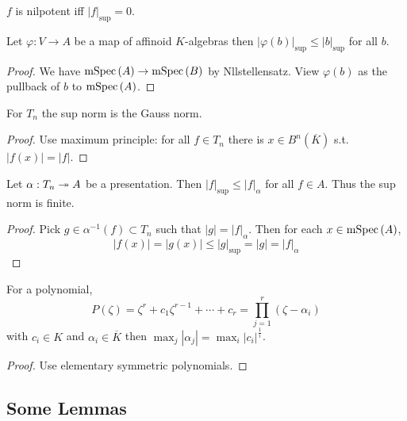 \documentclass[12pt]{article}
\begin{document}
\begin{rmk}
$f$ is nilpotent iff $|f|_{\sup} = 0$.
\end{rmk}

\begin{prop}
Let $\varphi : V \to A$ be a map of affinoid $K$-algebras then $|\varphi(b)|_{\sup} \le |b|_{\sup}$ for all $b$.
\end{prop}

\begin{proof}
We have $\mathrm{mSpec}\left( A \right) \to \mathrm{mSpec}\left( B \right)$ by Nllstellensatz. View $\varphi(b)$ as the pullback of $b$ to $\mathrm{mSpec}\left( A \right)$. 
\end{proof}

\begin{prop}
For $T_n$ the sup norm is the Gauss norm.
\end{prop}

\begin{proof}
Use maximum principle: for all $f \in T_n$ there is $x \in B^n(\overline{K})$ s.t. $|f(x)| = |f|$.
\end{proof}

\begin{prop}
Let $\alpha : T_n \twoheadrightarrow A$ be a presentation. Then $|f|_{\sup} \le |f|_{\alpha}$ for all $f \in A$. Thus the sup norm is finite.
\end{prop}

\begin{proof}
Pick $g \in \alpha^{-1}(f) \subset T_n$ such that $|g| = |f|_{\alpha}$. Then for each $x \in \mathrm{mSpec}\left( A \right)$,
\[ |f(x)| = |g(x)| \le |g|_{\sup} = |g| = |f|_{\alpha} \]
\end{proof}

\begin{lemma}
For a polynomial,
\[ P(\zeta) = \zeta^r + c_1 \zeta^{r-1} + \cdots + c_r = \prod_{j = 1}^r (\zeta - \alpha_i) \]
with $c_i \in K$ and $\alpha_i \in \overline{K}$ then $\max_j |\alpha_j| = \max_i |c_i|^{\frac{1}{i}}$. 
\end{lemma}

\begin{proof}
Use elementary symmetric polynomials. 
\end{proof}

\subsection{Some Lemmas}
\end{document}
